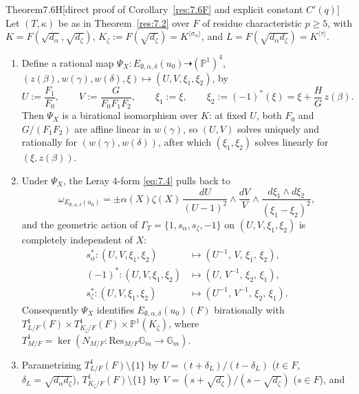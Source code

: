 \documentclass[12pt,letterpaper]{amsart}
\theoremstyle{plain}
\theoremstyle{definition}
\theoremstyle{remark}
\theoremstyle{definition}
\newcommand{\gga}{\mathbb{G}}
\begin{document}
\begin{res}{Theorem}{7.6H}[direct proof of Corollary~\ref{res:7.6F} and explicit constant $C'(q)$]\label{res:7.6H}
Let $(T,\kappa)$ be as in Theorem~\ref{res:7.2} over $F$ of residue
characteristic $p\ge 5$, with $K=F(\sqrt{d_\alpha},\sqrt{d_\zeta})$,
$K_\zeta:=F(\sqrt{d_\zeta})=K^{\langle\sigma_\alpha\rangle}$, and
$L=F(\sqrt{d_\alpha d_\zeta})=K^{\langle\tau\rangle}$.
\begin{enumerate}[{\upshape(a)}]
\item Define a rational map
$\Psi_X:E_{\emptyset,\alpha,\delta}(u_0)\dashrightarrow(\mathbb{P}^1)^4$,
$(z(\beta),w(\gamma),w(\delta),\xi)\mapsto(U,V,\xi_1,\xi_2)$, by
\begin{equation}\tag{7.11}\label{eq:7.11}
U:=\frac{F_1}{F_0},\qquad
V:=\frac{G}{F_0F_1F_2},\qquad
\xi_1:=\xi,\qquad
\xi_2:=(-1)^*(\xi)=\xi+\frac{H}{G}\,z(\beta).
\end{equation}
Then $\Psi_X$ is a birational isomorphism over $K$: at fixed $U$, both $F_0$
and $G/(F_1F_2)$ are affine linear in $w(\gamma)$, so $(U,V)$ solves uniquely
and rationally for $(w(\gamma),w(\delta))$, after which $(\xi_1,\xi_2)$ solves
linearly for $(\xi,z(\beta))$.
\item Under $\Psi_X$, the Leray $4$-form \eqref{eq:7.4} pulls back to
\begin{equation}\tag{7.12}\label{eq:7.12}
\omega_{E_{\emptyset,\alpha,\delta}(u_0)}
=\pm\alpha(X)\zeta(X)\,\frac{dU}{(U-1)^2}\wedge\frac{dV}{V}\wedge
\frac{d\xi_1\wedge d\xi_2}{(\xi_1-\xi_2)^2},
\end{equation}
and the geometric action of $\Gamma_T=\{1,s_\alpha,s_\zeta,-1\}$ on
$(U,V,\xi_1,\xi_2)$ is completely independent of $X$:
\[
\begin{aligned}
s_\alpha^*:(U,V,\xi_1,\xi_2)&\longmapsto(U^{-1},\,V,\,\xi_1,\,\xi_2),\\
(-1)^*:(U,V,\xi_1,\xi_2)&\longmapsto(U,\,V^{-1},\,\xi_2,\,\xi_1),\\
s_\zeta^*:(U,V,\xi_1,\xi_2)&\longmapsto(U^{-1},\,V^{-1},\,\xi_2,\,\xi_1).
\end{aligned}
\]
Consequently $\Psi_X$ identifies $E_{\emptyset,\alpha,\delta}(u_0)(F)$
birationally with $T^1_{L/F}(F)\times T^1_{K_\zeta/F}(F)\times\mathbb{P}^1(K_\zeta)$,
where $T^1_{M/F}=\ker(N_{M/F}:\mathrm{Res}_{M/F}\gga_m\to\gga_m)$.
\item Parametrizing $T^1_{L/F}(F)\setminus\{1\}$ by $U=(t+\delta_L)/(t-\delta_L)$
($t\in F$, $\delta_L=\sqrt{d_\alpha d_\zeta}$), $T^1_{K_\zeta/F}(F)\setminus\{1\}$
by $V=(s+\sqrt{d_\zeta})/(s-\sqrt{d_\zeta})$ ($s\in F$), and

\end{enumerate}
\end{res}
\end{document}
